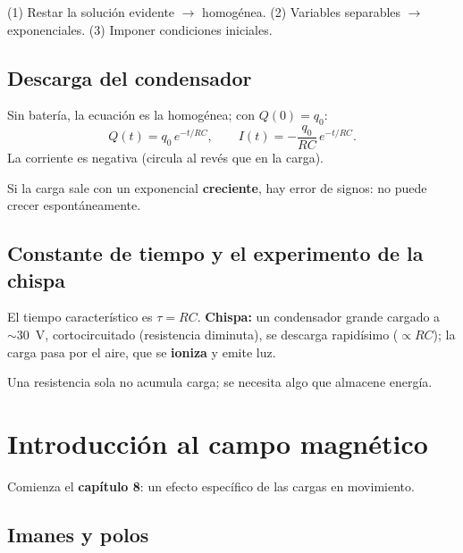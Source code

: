 \documentclass[12pt,a4paper]{article}
\begin{document}
\begin{notebox}
  (1) Restar la solución evidente $\to$ homogénea. (2) Variables
  separables $\to$ exponenciales. (3) Imponer condiciones iniciales.
\end{notebox}

\subsection{Descarga del condensador}

Sin batería, la ecuación es la homogénea; con $Q(0)=q_0$:
\[
\boxed{Q(t) = q_0\, e^{-t/RC}}, \qquad
I(t) = -\frac{q_0}{RC}\, e^{-t/RC}.
\]
La corriente es negativa (circula al revés que en la carga).

\begin{warnbox}
  Si la carga sale con un exponencial \textbf{creciente}, hay error de
  signos: no puede crecer espontáneamente.
\end{warnbox}

\subsection{Constante de tiempo y el experimento de la chispa}

El tiempo característico es $\tau = RC$. \textbf{Chispa:} un condensador
grande cargado a $\sim 30$~V, cortocircuitado (resistencia diminuta), se
descarga rapidísimo ($\propto RC$); la carga pasa por el aire, que se
\textbf{ioniza} y emite luz.

\begin{notebox}
  Una resistencia sola no acumula carga; se necesita algo que almacene
  energía.
\end{notebox}

\section{Introducción al campo magnético}

Comienza el \textbf{capítulo 8}: un efecto específico de las cargas en
movimiento.

\subsection{Imanes y polos}
\end{document}
